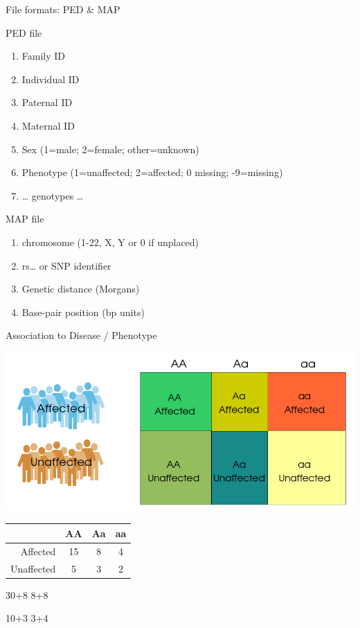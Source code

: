 \documentclass{beamer}
\begin{document}
\begin{frame}{File formats: PED \& MAP}

\begin{block}{PED file}

\begin{enumerate}
\def\labelenumi{\arabic{enumi}.}
\itemsep1pt\parskip0pt
\item
  Family ID
\item
  Individual ID
\item
  Paternal ID
\item
  Maternal ID
\item
  Sex (1=male; 2=female; other=unknown)
\item
  Phenotype (1=unaffected; 2=affected; 0 missing; -9=missing)
\item
  \ldots{} genotypes \ldots{}
\end{enumerate}

\end{block}

\begin{block}{MAP file}

\begin{enumerate}
\def\labelenumi{\arabic{enumi}.}
\itemsep1pt\parskip0pt
\item
  chromosome (1-22, X, Y or 0 if unplaced)
\item
  rs\ldots{} or SNP identifier
\item
  Genetic distance (Morgans)
\item
  Base-pair position (bp units)
\end{enumerate}

\end{block}

\end{frame}

\begin{frame}{Association to Disease / Phenotype}

\centerline{\includegraphics[scale=0.3]{images/asoc_table_3.png}}

\begin{longtable}[c]{@{}rccc@{}}
\toprule
~ & AA & Aa & aa\tabularnewline
\midrule
\endhead
Affected & 15 & 8 & 4\tabularnewline
Unaffected & 5 & 3 & 2\tabularnewline
\bottomrule
\end{longtable}

30+8 \textbar{} 8+8

10+3 \textbar{} 3+4

\end{frame}
\end{document}
